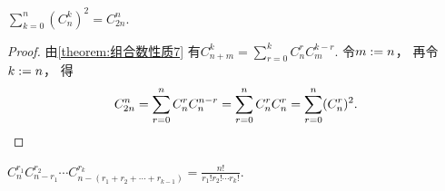 \begin{property}\label{theorem:组合数性质8}
\(\sum_{k=0}^n (C_n^k)^2 = C_{2n}^n\).
\begin{proof}
由\cref{theorem:组合数性质7}
有\(C_{n+m}^k = \sum_{r=0}^k C_n^r C_m^{k-r}\).
令\(m := n\)，
再令\(k := n\)，
得\begin{equation*}
	C_{2n}^n
	= \sum_{r=0}^n C_n^r C_n^{n-r}
	= \sum_{r=0}^n C_n^r C_n^r
	= \sum_{r=0}^n (C_n^r)^2.
	\qedhere
\end{equation*}
\end{proof}
\end{property}

\begin{property}\label{theorem:组合数性质9}
\(C_n^{r_1} C_{n-r_1}^{r_2} \dotsm C_{n-(r_1+r_2+\dotsb+r_{k-1})}^{r_k}
= \frac{n!}{r_1! r_2! \dotsm r_k!}\).
\end{property}

